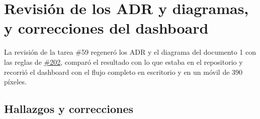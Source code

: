 \documentclass[11pt,a4paper]{report}
\newcommand{\pr}[1]{\href{https://github.com/PracticasESPE/Framework_Desarrollo_Seguro/pull/#1}{\##1}}
\begin{document}
\chapter{Revisión de los ADR y diagramas, y correcciones del dashboard}

La revisión de la tarea \#59 regeneró los ADR y el diagrama del documento 1 con las reglas de
\pr{202}, comparó el resultado con lo que estaba en el repositorio y recorrió el dashboard con el
flujo completo en escritorio y en un móvil de 390 píxeles.

\section{Hallazgos y correcciones}
\end{document}
